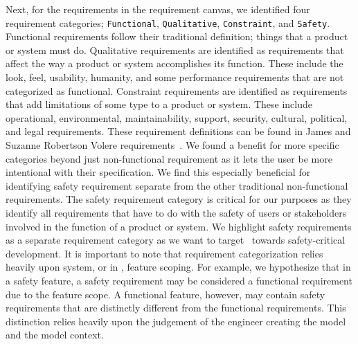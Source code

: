 Next, for the requirements in the requirement canvas, we identified four requirement categories; \texttt{Functional}, \texttt{Qualitative}, \texttt{Constraint}, and \texttt{Safety}. Functional requirements follow their traditional definition; things that a product or system must do. Qualitative requirements are identified as requirements that affect the way a product or system accomplishes its function. These include the look, feel, usability, humanity, and some performance requirements that are not categorized as functional. Constraint requirements are identified as requirements that add limitations of some type to a product or system. These include operational, environmental, maintainability, support, security, cultural, political, and legal requirements. These requirement definitions can be found in James and Suzanne Robertson Volere requirements~\cite{robertson2000volere}. We found a benefit for more specific categories beyond just non-functional requirement as it lets the user be more intentional with their specification. We find this especially beneficial for identifying safety requirement separate from the other traditional non-functional requirements. The safety requirement category is critical for our purposes as they identify all requirements that have to do with the safety of users or stakeholders involved in the function of a product or system. We highlight safety requirements as a separate requirement category as we want to target \tool\ towards safety-critical development. It is important to note that requirement categorization relies heavily upon system, or in \tool, feature scoping. For example, we hypothesize that in a safety feature, a safety requirement may be considered a functional requirement due to the feature scope. A functional feature, however, may contain safety requirements that are distinctly different from the functional requirements. This distinction relies heavily upon the judgement of the engineer creating the model and the model context.

